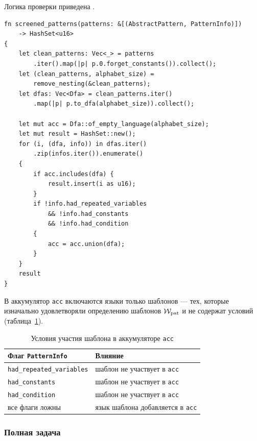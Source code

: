 Логика проверки приведена .

\begin{listing}[H]
\caption{Распознавание перекрытых предложений (упрощенная задача)}
\label{lst:screened-patterns}
\begin{verbatim}
fn screened_patterns(patterns: &[(AbstractPattern, PatternInfo)])
    -> HashSet<u16>
{
    let clean_patterns: Vec<_> = patterns
        .iter().map(|p| p.0.forget_constants()).collect();
    let (clean_patterns, alphabet_size) =
        remove_nesting(&clean_patterns);
    let dfas: Vec<Dfa> = clean_patterns.iter()
        .map(|p| p.to_dfa(alphabet_size)).collect();

    let mut acc = Dfa::of_empty_language(alphabet_size);
    let mut result = HashSet::new();
    for (i, (dfa, info)) in dfas.iter()
        .zip(infos.iter()).enumerate()
    {
        if acc.includes(dfa) {
            result.insert(i as u16);
        }
        if !info.had_repeated_variables
            && !info.had_constants
            && !info.had_condition
        {
            acc = acc.union(dfa);
        }
    }
    result
}
\end{verbatim}
\end{listing}

В аккумулятор \texttt{acc} включаются языки только  шаблонов --- тех, которые изначально удовлетворяли определению шаблонов $\mathcal{W}_{\text{pat}}$ и не содержат условий (таблица~\ref{tab:pattern-info-acc}).

\begin{table}[htbp]
\centering
\caption{Условия участия шаблона в аккумуляторе \texttt{acc}}
\label{tab:pattern-info-acc}
\begin{tabular}{@{}ll@{}}
\toprule
Флаг \texttt{PatternInfo} & Влияние \\
\midrule
\texttt{had\_repeated\_variables} & шаблон не участвует в \texttt{acc} \\
\texttt{had\_constants} & шаблон не участвует в \texttt{acc} \\
\texttt{had\_condition} & шаблон не участвует в \texttt{acc} \\
все флаги ложны & язык шаблона добавляется в \texttt{acc} \\
\bottomrule
\end{tabular}
\end{table}

\subsubsection{Полная задача}

